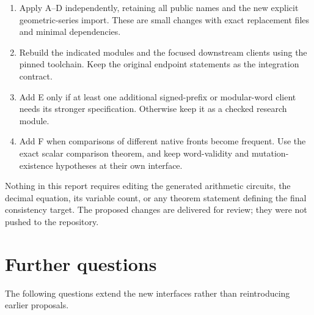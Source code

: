 \documentclass[11pt,a4paper]{article}
\begin{document}
\begin{enumerate}
\item Apply A--D independently, retaining all public names and the new explicit geometric-series import. These are small changes with exact replacement files and minimal dependencies.
\item Rebuild the indicated modules and the focused downstream clients using the pinned toolchain. Keep the original endpoint statements as the integration contract.
\item Add E only if at least one additional signed-prefix or modular-word client needs its stronger specification. Otherwise keep it as a checked research module.
\item Add F when comparisons of different native fronts become frequent. Use the exact scalar comparison theorem, and keep word-validity and mutation-existence hypotheses at their own interface.
\end{enumerate}

Nothing in this report requires editing the generated arithmetic circuits, the decimal equation, its variable count, or any theorem statement defining the final consistency target. The proposed changes are delivered for review; they were not pushed to the repository.

\section{Further questions}

The following questions extend the new interfaces rather than reintroducing earlier proposals.
\end{document}
